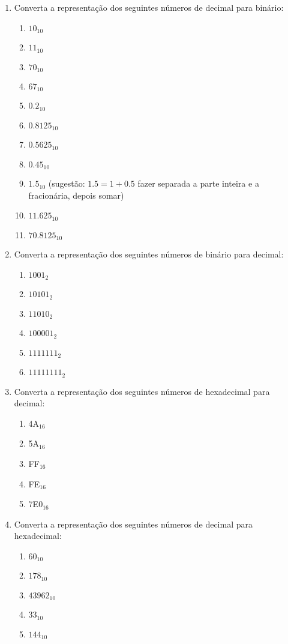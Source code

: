 \documentclass[a4paper]{article}
\begin{document}
\begin{enumerate}
\item Converta a representação dos seguintes números de decimal para binário:

  \begin{enumerate}
  \item $10_{10}$ %
  \item $11_{10}$ %
  \item $70_{10}$ %
  \item $67_{10}$ %
  \item $0.2_{10}$ %
  \item $0.8125_{10}$ %
  \item $0.5625_{10}$ %
  \item $0.45_{10}$ %
  \item $1.5_{10}$ (sugestão: $1.5 = 1 + 0.5$ fazer separada a parte
    inteira e a fracionária, depois somar) %
  \item $11.625_{10}$ %
  \item $70.8125_{10}$ %
  \end{enumerate}

\item Converta a representação dos seguintes números de binário para
  decimal:
  \begin{enumerate}
  \item $1001_2$ %
  \item $10101_2$ %
  \item $11010_2$ %
  \item $100001_2$ %
  \item $1111111_2$ %
  \item $11111111_2$ %
  \end{enumerate}

\item Converta a representação dos seguintes números de hexadecimal
  para decimal:
  \begin{enumerate}
  \item 4A$_{16}$ %
  \item 5A$_{16}$ %
  \item FF$_{16}$ %
  \item FE$_{16}$ %
  \item 7E0$_{16}$ %
  \end{enumerate}

\item Converta a representação dos seguintes números de decimal para
  hexadecimal:
  \begin{enumerate}
  \item $60_{10}$ %
  \item $178_{10}$ %
  \item $43962_{10}$ %
  \item $33_{10}$ %
  \item $144_{10}$ %
  \end{enumerate}
\end{enumerate}
\end{document}
